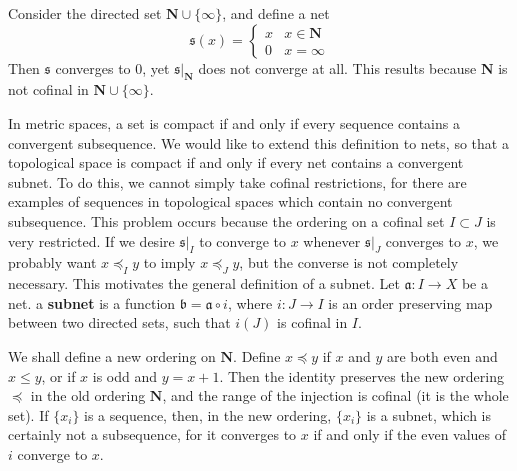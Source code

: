 \begin{example}
    Consider the directed set $\mathbf{N} \cup \{ \infty \}$, and define a net
    \[ \mathfrak{s}(x) = \begin{cases} x & x \in \mathbf{N} \\ 0 & x = \infty \end{cases} \]
    Then $\mathfrak{s}$ converges to $0$, yet $\mathfrak{s}|_\mathbf{N}$ does not converge at all. This results because $\mathbf{N}$ is not cofinal in $\mathbf{N} \cup \{ \infty \}$.
\end{example}

In metric spaces, a set is compact if and only if every sequence contains a convergent subsequence. We would like to extend this definition to nets, so that a topological space is compact if and only if every net contains a convergent subnet. To do this, we cannot simply take cofinal restrictions, for there are examples of sequences in topological spaces which contain no convergent subsequence. This problem occurs because the ordering on a cofinal set $I \subset J$ is very restricted. If we desire $\mathfrak{s}|_I$ to converge to $x$ whenever $\mathfrak{s}|_J$ converges to $x$, we probably want $x \preceq_I y$ to imply $x \preceq_J y$, but the converse is not completely necessary. This motivates the general definition of a subnet. Let $\mathfrak{a}: I \to X$ be a net. a {\bf subnet} is a function $\mathfrak{b} = \mathfrak{a} \circ i$, where $i: J \to I$ is an order preserving map between two directed sets, such that $i(J)$ is cofinal in $I$.

\begin{example}
    We shall define a new ordering on $\mathbf{N}$. Define $x \preceq y$ if $x$ and $y$ are both even and $x \leq y$, or if $x$ is odd and $y = x + 1$. Then the identity preserves the new ordering $\preceq$ in the old ordering $\mathbf{N}$, and the range of the injection is cofinal (it is the whole set). If $\{ x_i \}$ is a sequence, then, in the new ordering, $\{ x_i \}$ is a subnet, which is certainly not a subsequence, for it converges to $x$ if and only if the even values of $i$ converge to $x$.
\end{example}

